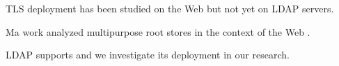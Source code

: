

\gls{TLS} deployment has been studied on the Web \cite{muhammad2023,holz2016,quirin2018,Kotzias2018} but not yet on \gls{LDAP} servers.


 Ma \etal work analyzed multipurpose root stores in the context of the Web \cite{maTracingYourRoots2021}.




 \gls{LDAP} supports \starttls \cite{rfc4511} and we investigate its deployment in our research.


